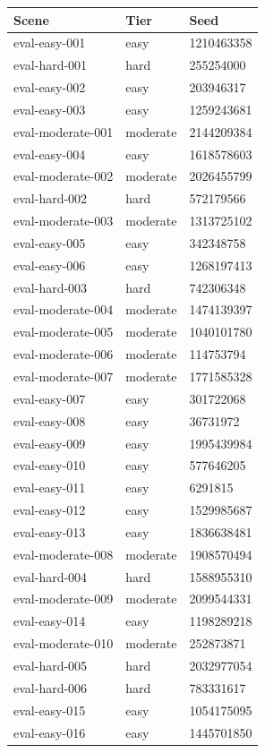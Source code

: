 \begin{tabular}{lll}
\hline
Scene & Tier & Seed \\
\hline
eval-easy-001 & easy & 1210463358 \\
eval-hard-001 & hard & 255254000 \\
eval-easy-002 & easy & 203946317 \\
eval-easy-003 & easy & 1259243681 \\
eval-moderate-001 & moderate & 2144209384 \\
eval-easy-004 & easy & 1618578603 \\
eval-moderate-002 & moderate & 2026455799 \\
eval-hard-002 & hard & 572179566 \\
eval-moderate-003 & moderate & 1313725102 \\
eval-easy-005 & easy & 342348758 \\
eval-easy-006 & easy & 1268197413 \\
eval-hard-003 & hard & 742306348 \\
eval-moderate-004 & moderate & 1474139397 \\
eval-moderate-005 & moderate & 1040101780 \\
eval-moderate-006 & moderate & 114753794 \\
eval-moderate-007 & moderate & 1771585328 \\
eval-easy-007 & easy & 301722068 \\
eval-easy-008 & easy & 36731972 \\
eval-easy-009 & easy & 1995439984 \\
eval-easy-010 & easy & 577646205 \\
eval-easy-011 & easy & 6291815 \\
eval-easy-012 & easy & 1529985687 \\
eval-easy-013 & easy & 1836638481 \\
eval-moderate-008 & moderate & 1908570494 \\
eval-hard-004 & hard & 1588955310 \\
eval-moderate-009 & moderate & 2099544331 \\
eval-easy-014 & easy & 1198289218 \\
eval-moderate-010 & moderate & 252873871 \\
eval-hard-005 & hard & 2032977054 \\
eval-hard-006 & hard & 783331617 \\
eval-easy-015 & easy & 1054175095 \\
eval-easy-016 & easy & 1445701850 \\

\end{tabular}
